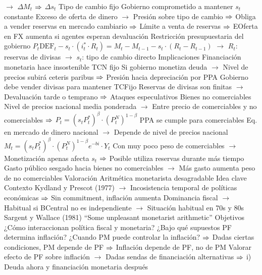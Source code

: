 \documentclass{nuevotema}
\begin{document}
\begin{esquemal}
				\4[] $\to$ $\Delta M_t$ $\Rightarrow$ $\Delta s_t$
				\4 Tipo de cambio fijo
				\4[] Gobierno comprometido a mantener $s_t$ constante
				\4[] Exceso de oferta de dinero
				\4[] $\to$ Presión sobre tipo de cambio
				\4[] $\Rightarrow$ Obliga a vender reservas en mercado cambiario
				\4[] $\Rightarrow$ Límite a venta de reservas
				\4[] $\Rightarrow$ EOferta en FX aumenta si agentes esperan devaluación
				\4 Restricción presupuestaria del gobierno
				\4[] $P_t \text{DEF}_t  - s_t \cdot (i_t^* \cdot R_t) =  M_t - M_{t-1} - s_t \cdot (R_t - R_{t-1}) $
				\4[] $\to$ $R_t$: reservas de divisas
				\4[] $\to$ $s_t$: tipo de cambio directo
			\3 Implicaciones
				\4 Financiación monetaria hace insostenible TCN fijo
				\4[] Si gobierno monetiza deuda
				\4[] $\to$ Nivel de precios subirá ceteris paribus
				\4[] $\Rightarrow$ Presión hacia depreciación por PPA
				\4[] Gobierno debe vender divisas para mantener TCFijo
				\4[] Reservas de divisas son finitas
				\4[] $\to$ Devaluación tarde o temprano
				\4[] $\Rightarrow$ Ataques especulativos
				\4 Bienes no comerciables
				\4[] Nivel de precios nacional media ponderada
				\4[] $\to$ Entre precio de comerciables y no comerciables
				\4[] $\Rightarrow$ $P_t = (s_t P^*_t)^\beta \cdot (P_t^N)^{1-\beta}$
				\4[] PPA se cumple para comerciables
				\4[] Eq. en mercado de dinero nacional
				\4[] $\to$ Depende de nivel de precios nacional
				\4[] $M_t = (s_t P^*_t)^\beta \cdot (P_t^N)^{1-\beta} e^{-bi}\cdot Y_t$
				\4[] Con muy poco peso de comerciables
				\4[] $\to$ Monetización apenas afecta $s_t$
				\4[] $\Rightarrow$ Posible utiliza reservas durante más tiempo
				\4[] Gasto público sesgado hacia bienes no comerciables
				\4[] $\to$ Más gasto aumenta peso de no comerciables
			\3 Valoración
		\2 Aritmética monetarista desagradable
			\3 Idea clave
				\4 Contexto
				\4[] Kydland y Prescot (1977)
				\4[] $\to$ Incosistencia temporal de políticas económicas
				\4[] $\Rightarrow$ Sin commitment, inflación aumenta
				\4[] Dominancia fiscal
				\4[] $\to$ Habitual si BCentral no es independiente
				\4[] $\to$ Situación habitual en 70s y 80s
				\4[] Sargent y Wallace (1981)
				\4[] ``Some unpleasant monetarist arithmetic''
				\4 Objetivos
				\4[] ¿Cómo interaccionan política fiscal y monetaria?
				\4[] ¿Bajo qué supuestos PF determina inflación?
				\4[] ¿Cuando PM puede controlar la inflación?
				\4[] $\Rightarrow$ Dadas ciertas condiciones, PM depende de PF
				\4[] $\Rightarrow$ Inflación depende de PF, no de PM
				\4[] Valorar efecto de PF sobre inflación
				\4[] $\to$ Dadas sendas de financiación alternativas
				\4[] $\Rightarrow$ i) Deuda ahora y financiación monetaria después

\end{esquemal}
\end{document}
